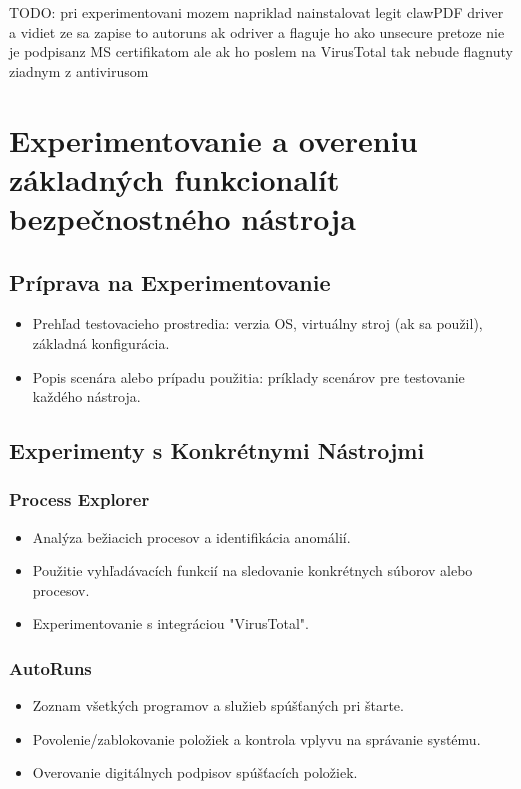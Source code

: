 \documentclass[conference]{IEEEtran}
\begin{document}
TODO: pri experimentovani mozem napriklad nainstalovat legit clawPDF driver a vidiet ze sa zapise to autoruns ak odriver a flaguje ho ako unsecure pretoze nie je podpisanz MS certifikatom ale ak ho poslem na VirusTotal tak nebude flagnuty ziadnym z antivirusom

\section{Experimentovanie a overeniu základných funkcionalít bezpečnostného nástroja}
\subsection{Príprava na Experimentovanie}
\begin{itemize}
    \item Prehľad testovacieho prostredia: verzia OS, virtuálny stroj (ak sa použil), základná konfigurácia.
    \item Popis scenára alebo prípadu použitia: príklady scenárov pre testovanie každého nástroja.
\end{itemize}

\subsection{Experimenty s Konkrétnymi Nástrojmi}
\subsubsection{Process Explorer}
\begin{itemize}
    \item Analýza bežiacich procesov a identifikácia anomálií.
    \item Použitie vyhľadávacích funkcií na sledovanie konkrétnych súborov alebo procesov.
    \item Experimentovanie s integráciou "VirusTotal".
\end{itemize}

\subsubsection{AutoRuns}
\begin{itemize}
    \item Zoznam všetkých programov a služieb spúšťaných pri štarte.
    \item Povolenie/zablokovanie položiek a kontrola vplyvu na správanie systému.
    \item Overovanie digitálnych podpisov spúšťacích položiek.
\end{itemize}
\end{document}
